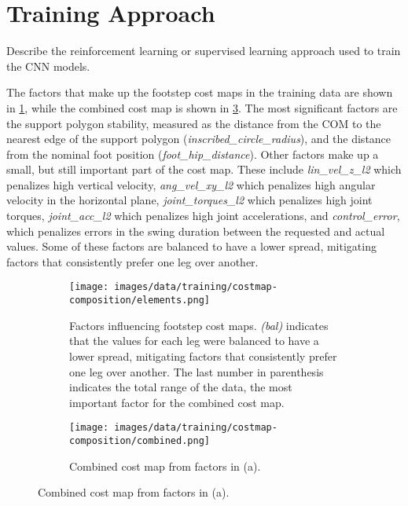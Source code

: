 \section{Training Approach}

\begin{outline}
  Describe the reinforcement learning or supervised learning approach
  used to train the CNN models.
\end{outline}

The factors that make up the footstep cost maps in the training data
are shown in \ref{fig:costmap-composition-elements}, while the
combined cost map is shown in \ref{fig:costmap-composition-combined}.
The most significant factors are the support polygon stability,
measured as the distance from the COM to the nearest edge of the
support polygon (\textit{inscribed\_circle\_radius}), and the
distance from the nominal foot position
(\textit{foot\_hip\_distance}). Other factors make up a small, but
still important part of the cost map. These include
\textit{lin\_vel\_z\_l2} which penalizes high vertical velocity,
\textit{ang\_vel\_xy\_l2} which penalizes high angular velocity in
the horizontal plane, \textit{joint\_torques\_l2} which penalizes
high joint torques, \textit{joint\_acc\_l2} which penalizes high
joint accelerations, and \textit{control\_error}, which penalizes
errors in the swing duration between the requested and actual values.
Some of these factors are balanced to have a lower spread, mitigating
factors that consistently prefer one leg over another.

\begin{figure}
  \centering
  \begin{subfigure}[T]{0.65\textwidth}
    \centering
    \texttt{[image: images/data/training/costmap-composition/elements.png]}
    \caption{Factors influencing footstep cost maps. \textit{(bal)}
      indicates that the values for each leg were balanced to have a
      lower spread, mitigating factors that consistently prefer one leg
      over another. The last number in parenthesis indicates the total
    range of the data, the most important factor for the combined cost map.}
    \label{fig:costmap-composition-elements}
  \end{subfigure}
  \hfill
  \begin{subfigure}[T]{0.3\textwidth}
    \centering
    \texttt{[image: images/data/training/costmap-composition/combined.png]}
    \caption{Combined cost map from factors in (a).}
    \label{fig:costmap-composition-combined}
  \end{subfigure}
  \hfill
\end{figure}


